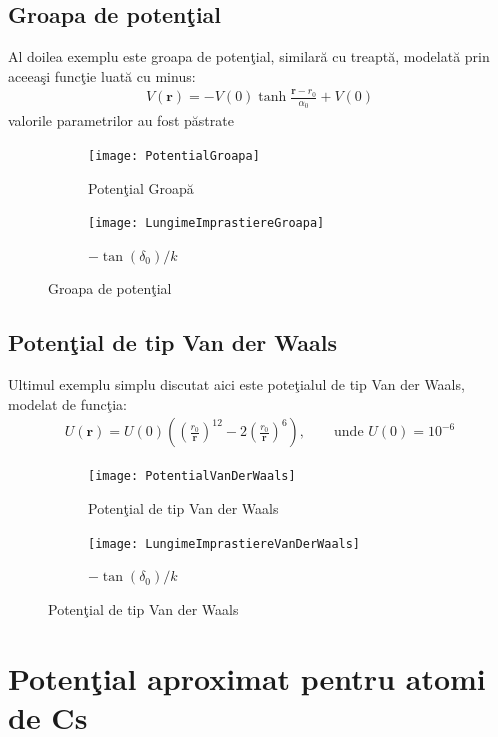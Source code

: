 \subsection{Groapa de poten\c{t}ial}
Al doilea exemplu este groapa de poten\c{t}ial, similar\u{a} cu treapt\u{a}, modelat\u{a} prin aceea\c{s}i func\c{t}ie luat\u{a} cu minus: 
\begin{align}
V({\bm r})=-V(0)\tanh{\frac{{\bm r}-r_0}{\alpha_0}}+V(0)
\end{align}
valorile parametrilor au fost p\u{a}strate
\begin{figure}[h]
\centering
\begin{subfigure}{.5\textwidth}
  \centering
  \texttt{[image: PotentialGroapa]}
  \caption{Poten\c{t}ial Groap\u{a}}
  \label{fig:sub321}
\end{subfigure}%
\begin{subfigure}{.5\textwidth}
  \centering
  \texttt{[image: LungimeImprastiereGroapa]}
  \caption{$-\tan(\delta_0)/k$}
  \label{fig:sub322}
\end{subfigure}
\caption{Groapa de poten\c{t}ial}
\label{fig:groapa}
\end{figure}


\subsection{Poten\c{t}ial de tip Van der Waals}
Ultimul exemplu simplu discutat aici este pote\c{t}ialul de tip Van der Waals, modelat de func\c{t}ia:
\begin{align}
U({\bm r})=U(0)\left(\left(\frac{r_0}{{\bm r}}\right)^12-2\left(\frac{r_0}{{\bm r}}\right)^6\right), \qquad \text{unde } U(0)=10^{-6}
\end{align}

\begin{figure}[h]
\centering
\begin{subfigure}{.5\textwidth}
  \centering
  \texttt{[image: PotentialVanDerWaals]}
  \caption{Poten\c{t}ial de tip Van der Waals}
  \label{fig:sub331}
\end{subfigure}%
\begin{subfigure}{.5\textwidth}
  \centering
  \texttt{[image: LungimeImprastiereVanDerWaals]}
  \caption{$-\tan(\delta_0)/k$}
  \label{fig:sub332}
\end{subfigure}
\caption{Poten\c{t}ial de tip Van der Waals}
\label{fig:groapa}
\end{figure}


\section{Poten\c{t}ial aproximat pentru atomi de Cs}

